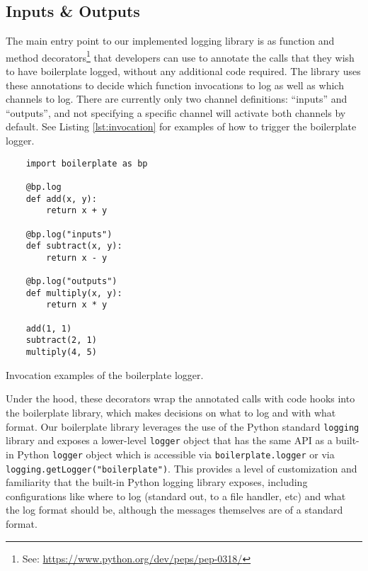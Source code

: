 \documentclass[acmsmall,review,authorversion]{acmart}
\newcommand{\code}[1]{\lstinline[basicstyle=\ttfamily\small]~#1~}
\begin{document}
\subsection{Inputs \& Outputs}

The main entry point to our implemented logging library is as function and method decorators\footnote{See: \href{https://www.python.org/dev/peps/pep-0318/}{https://www.python.org/dev/peps/pep-0318/}} that developers can use to annotate the calls that they wish to have boilerplate logged, without any additional code required. The library uses these annotations to decide which function invocations to log as well as which channels to log. There are currently only two channel definitions: ``inputs'' and ``outputs'', and not specifying a specific channel will activate both channels by default. See Listing \ref{lst:invocation} for examples of how to trigger the boilerplate logger.

\begin{listing}[H]
    \begin{verbatim}
    import boilerplate as bp

    @bp.log
    def add(x, y):
        return x + y

    @bp.log("inputs")
    def subtract(x, y):
        return x - y

    @bp.log("outputs")
    def multiply(x, y):
        return x * y

    add(1, 1)
    subtract(2, 1)
    multiply(4, 5)
    \end{verbatim}
    \caption{Invocation examples of the boilerplate logger.}
    \label{lst:invocation}
\end{listing}

Under the hood, these decorators wrap the annotated calls with code hooks into the boilerplate library, which makes decisions on what to log and with what format. Our boilerplate library leverages the use of the Python standard \code{logging} library and exposes a lower-level \code{logger} object that has the same API as a built-in Python \code{logger} object which is accessible via \code{boilerplate.logger} or via \code{logging.getLogger("boilerplate")}. This provides a level of customization and familiarity that the built-in Python logging library exposes, including configurations like where to log (standard out, to a file handler, etc) and what the log format should be, although the messages themselves are of a standard format.
\end{document}
